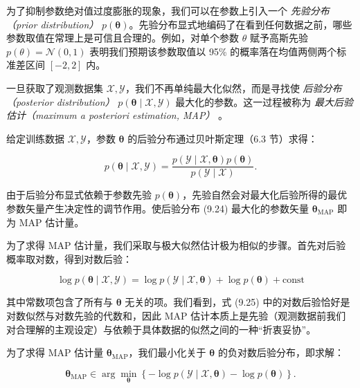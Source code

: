 为了抑制参数绝对值过度膨胀的现象，我们可以在参数上引入一个 \emph{先验分布（prior distribution）} $ p(\boldsymbol{\theta}) $。先验分布显式地编码了在看到任何数据之前，哪些参数取值在常理上是可信且合理的。例如，对单个参数 $ \theta $ 赋予高斯先验 $ p(\theta) = \mathcal{N}(0, 1) $ 表明我们预期该参数取值以 95\% 的概率落在均值两侧两个标准差区间 $ [-2, 2] $ 内。

一旦获取了观测数据集 $ \mathcal{X}, \mathcal{Y} $，我们不再单纯最大化似然，而是寻找使 \emph{后验分布（posterior distribution）} $ p(\boldsymbol{\theta} \mid \mathcal{X}, \mathcal{Y}) $ 最大化的参数。这一过程被称为 \emph{最大后验估计（maximum a posteriori estimation, MAP）} 。

给定训练数据 $ \mathcal{X}, \mathcal{Y} $，参数 $ \boldsymbol{\theta} $ 的后验分布通过贝叶斯定理（6.3 节）求得：

\begin{equation}
p(\boldsymbol{\theta} \mid \mathcal{X}, \mathcal{Y}) = \frac{p(\mathcal{Y} \mid \mathcal{X}, \boldsymbol{\theta})p(\boldsymbol{\theta})}{p(\mathcal{Y} \mid \mathcal{X})} .
\tag{9.24}
\end{equation}

由于后验分布显式依赖于参数先验 $ p(\boldsymbol{\theta}) $，先验自然会对最大化后验所得的最优参数矢量产生决定性的调节作用。使后验分布 (9.24) 最大化的参数矢量 $ \boldsymbol{\theta}_{\text{MAP}} $ 即为 MAP 估计量。

为了求得 MAP 估计量，我们采取与极大似然估计极为相似的步骤。首先对后验概率取对数，得到对数后验：

\begin{equation}
\log p(\boldsymbol{\theta} \mid \mathcal{X}, \mathcal{Y}) = \log p(\mathcal{Y} \mid \mathcal{X}, \boldsymbol{\theta}) + \log p(\boldsymbol{\theta}) + \text{const}
\tag{9.25}
\end{equation}

其中常数项包含了所有与 $ \boldsymbol{\theta} $ 无关的项。我们看到，式 (9.25) 中的对数后验恰好是对数似然与对数先验的代数和，因此 MAP 估计本质上是先验（观测数据前我们对合理解的主观设定）与依赖于具体数据的似然之间的一种“折衷妥协”。

为了求得 MAP 估计量 $ \boldsymbol{\theta}_{\text{MAP}} $，我们最小化关于 $ \boldsymbol{\theta} $ 的负对数后验分布，即求解：

\begin{equation}
\boldsymbol{\theta}_{\text{MAP}} \in \arg\min_{\boldsymbol{\theta}} \left\{ -\log p(\mathcal{Y} \mid \mathcal{X}, \boldsymbol{\theta}) - \log p(\boldsymbol{\theta}) \right\} .
\tag{9.26}
\end{equation}

